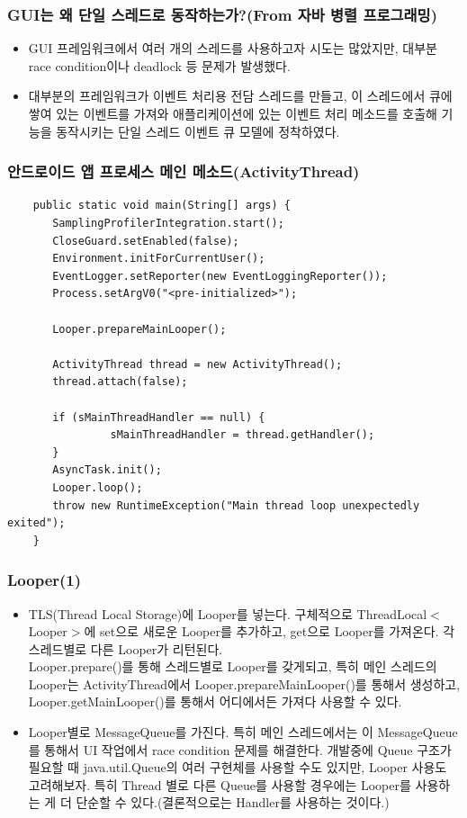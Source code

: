 \documentclass{beamer}
\newcommand\Fontvi{\fontsize{8}{9.6}\selectfont}
\begin{document}
\begin{frame}
\frametitle{GUI는 왜 단일 스레드로 동작하는가?(From 자바 병렬 프로그래밍)}
\begin{itemize}
\item GUI 프레임워크에서 여러 개의 스레드를 사용하고자 시도는 많았지만, 대부분 race condition이나 deadlock 등 문제가 발생했다. 
\item 대부분의 프레임워크가 이벤트 처리용 전담 스레드를 만들고, 이 스레드에서 큐에 쌓여 있는 이벤트를 가져와 애플리케이션에 있는 이벤트 처리 메소드를 호출해 기능을 동작시키는 단일 스레드 이벤트 큐 모델에 정착하였다.
\end{itemize}
\end{frame}

\begin{frame}[fragile]
\frametitle{안드로이드 앱 프로세스 메인 메소드(ActivityThread)}
\Fontvi
\begin{verbatim} 
	public static void main(String[] args) {
	   SamplingProfilerIntegration.start();
	   CloseGuard.setEnabled(false);
	   Environment.initForCurrentUser();
	   EventLogger.setReporter(new EventLoggingReporter());
	   Process.setArgV0("<pre-initialized>");

	   Looper.prepareMainLooper();

	   ActivityThread thread = new ActivityThread();
	   thread.attach(false);

	   if (sMainThreadHandler == null) {
	        	sMainThreadHandler = thread.getHandler();
	   }
	   AsyncTask.init();
	   Looper.loop();
	   throw new RuntimeException("Main thread loop unexpectedly exited");
	}
\end{verbatim}
\end{frame}

\begin{frame}
\frametitle{Looper(1)}
\begin{itemize}
\item TLS(Thread Local Storage)에 Looper를 넣는다. 구체적으로 ThreadLocal$<$Looper$>$에 set으로 새로운 Looper를 추가하고, get으로 Looper를 가져온다. 각 스레드별로 다른 Looper가 리턴된다.\\
Looper.prepare()를 통해 스레드별로 Looper를 갖게되고, 특히 메인 스레드의 Looper는 ActivityThread에서 Looper.prepareMainLooper()를 통해서 생성하고, Looper.getMainLooper()를 통해서 어디에서든 가져다 사용할 수 있다.
\item Looper별로 MessageQueue를 가진다. 특히 메인 스레드에서는 이 MessageQueue를 통해서 UI 작업에서 race condition 문제를 해결한다. 개발중에 Queue 구조가 필요할 때 java.util.Queue의 여러 구현체를 사용할 수도 있지만, Looper 사용도 고려해보자. 특히 Thread 별로 다른 Queue를 사용할 경우에는 Looper를 사용하는 게 더 단순할 수 있다.(결론적으로는 Handler를 사용하는 것이다.)
\end{itemize}
\end{frame}
\end{document}
